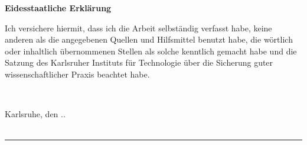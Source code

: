 
\begin{huge}
    \textbf{Eidesstaatliche Erklärung}\ \\
\end{huge}

\vspace{3cm}

Ich versichere hiermit, dass ich die Arbeit selbständig verfasst habe, keine anderen als die angegebenen Quellen und Hilfsmittel benutzt habe, die wörtlich oder inhaltlich übernommenen Stellen als solche kenntlich gemacht habe und die Satzung des Karlsruher Instituts für Technologie über die Sicherung guter wissenschaftlicher Praxis beachtet habe.

\vspace{1.5cm}

\ \\
\begin{large}
Karlsruhe, den \the\day.\the\month.\the\year \\
\ \\
\hspace*{0.45\textwidth}\begin{minipage}{\textwidth}
    \rule{0.5\textwidth}{.1pt}\\
    \authorname
\end{minipage}
\end{large}
